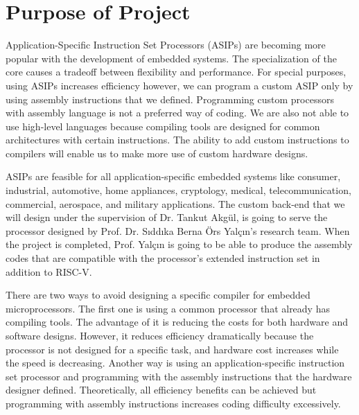 \section{Purpose of Project}
Application-Specific Instruction Set Processors (ASIPs) are becoming more popular with the development of embedded systems. The specialization of the core causes a tradeoff between flexibility and performance. For special purposes, using ASIPs increases efficiency however, we can program a custom ASIP only by using assembly instructions that we defined. Programming custom processors with assembly language is not a preferred way of coding. We are also not able to use high-level languages because compiling tools are designed for common architectures with certain instructions. The ability to add custom instructions to compilers will enable us to make more use of custom hardware designs.

ASIPs are feasible for all application-specific embedded systems like consumer, industrial, automotive, home appliances, cryptology, medical, telecommunication, commercial, aerospace, and military applications. The custom back-end that we will design under the supervision of Dr. Tankut Akgül, is going to serve the processor designed by Prof. Dr. Sıddıka Berna Örs Yalçın’s research team. When the project is completed, Prof. Yalçın is going to be able to produce the assembly codes that are compatible with the processor’s extended instruction set in addition to RISC-V.

There are two ways to avoid designing a specific compiler for embedded microprocessors. The first one is using a common processor that already has compiling tools. The advantage of it is reducing the costs for both hardware and software designs. However, it reduces efficiency dramatically because the processor is not designed for a specific task, and hardware cost increases while the speed is decreasing. Another way is using an application-specific instruction set processor and programming with the assembly instructions that the hardware designer defined. Theoretically, all efficiency benefits can be achieved but programming with assembly instructions increases coding difficulty excessively.

